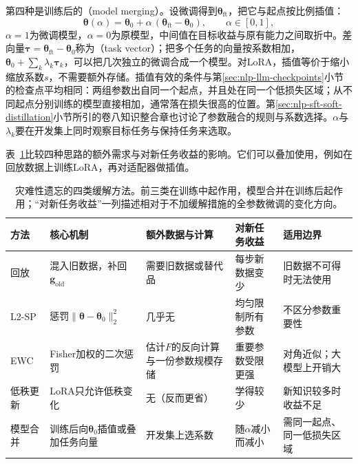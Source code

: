 第四种是训练后的（model merging）。设微调得到$\bm\theta_{\mathrm{ft}}$，把它与起点按比例插值：
\begin{equation}
 \bm\theta(\alpha)=\bm\theta_0+\alpha\,(\bm\theta_{\mathrm{ft}}-\bm\theta_0),\qquad \alpha\in[0,1],
 \label{eq:nlp-sft-merge}
\end{equation}
$\alpha=1$为微调模型，$\alpha=0$为原模型，中间值在目标收益与原有能力之间取折中。差向量$\bm\tau=\bm\theta_{\mathrm{ft}}-\bm\theta_0$称为（task vector）；把多个任务的向量按系数相加，$\bm\theta_0+\sum_k\lambda_k\bm\tau_k$，可以把几次独立的微调合成一个模型。对LoRA，插值等价于缩小缩放系数$s$，不需要额外存储。插值有效的条件与第\ref{sec:nlp-llm-checkpoints}小节的检查点平均相同：两组参数出自同一个起点，并且处在同一个低损失区域；从不同起点分别训练的模型直接相加，通常落在损失很高的位置。第\ref{sec:nlp-sft-soft-distillation}小节所引的卷八知识整合章也讨论了参数融合的规则与系数选择。$\alpha$与$\lambda_k$要在开发集上同时观察目标任务与保持任务来选取。

表~\ref{tab:nlp-sft-forgetting-methods}比较四种思路的额外需求与对新任务收益的影响。它们可以叠加使用，例如在回放数据上训练LoRA，再对适配器做插值。

\begin{table}[tbp]
  \small
  \begin{tabularx}{\linewidth}{@{}p{22mm}p{40mm}p{34mm}p{30mm}X@{}}
    \toprule
    方法 & 核心机制 & 额外数据与计算 & 对新任务收益 & 适用边界\\
    \midrule
    回放 & 混入旧数据，补回$\bm g_{\mathrm{old}}$ & 需要旧数据或替代品 & 每步新数据变少 & 旧数据不可得时无法使用\\
    L2-SP & 惩罚$\lVert\bm\theta-\bm\theta_0\rVert_2^2$ & 几乎无 & 均匀限制所有参数 & 不区分参数重要性\\
    EWC & Fisher加权的二次惩罚 & 估计$F$的反向计算与一份参数规模存储 & 重要参数受限更强 & 对角近似；大模型上开销大\\
    低秩更新 & LoRA只允许低秩变化 & 无（反而更省） & 学得较少 & 新知识较多时收益不足\\
    模型合并 & 训练后向$\bm\theta_0$插值或叠加任务向量 & 开发集上选系数 & 随$\alpha$减小而减小 & 需同一起点、同一低损失区域\\
    \bottomrule
  \end{tabularx}
  \caption{灾难性遗忘的四类缓解方法。前三类在训练中起作用，模型合并在训练后起作用；“对新任务收益”一列描述相对于不加缓解措施的全参数微调的变化方向。}
  \label{tab:nlp-sft-forgetting-methods}
\end{table}

